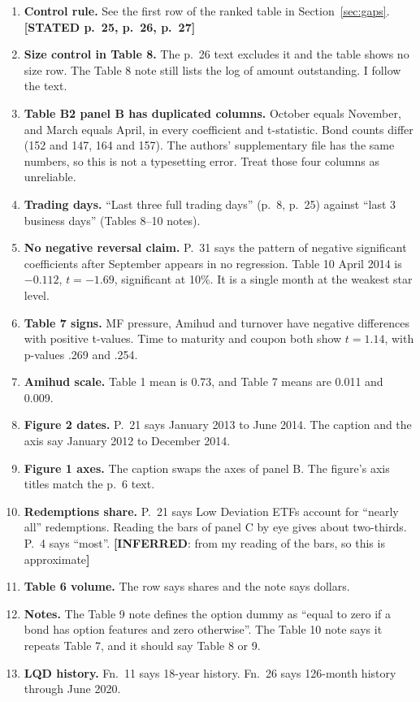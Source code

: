 \documentclass[10pt,a4paper]{article}
\newcommand{\ST}[1]{\textcolor{cst}{\textbf{[STATED #1]}}}
\newcommand{\IN}[1]{\textcolor{cin}{\textbf{[INFERRED}: #1\textbf{]}}}
\begin{document}
\begin{enumerate}
\item \textbf{Control rule.} See the first row of the ranked table in Section~\ref{sec:gaps}. \ST{p.~25, p.~26, p.~27}
\item \textbf{Size control in Table 8.} The p.~26 text excludes it and the table shows no size row. The Table 8 note still lists the log of amount outstanding. I follow the text.
\item \textbf{Table B2 panel B has duplicated columns.} October equals November, and March equals April, in every coefficient and t-statistic. Bond counts differ (152 and 147, 164 and 157). The authors' supplementary file has the same numbers, so this is not a typesetting error. Treat those four columns as unreliable.
\item \textbf{Trading days.} ``Last three full trading days'' (p.~8, p.~25) against ``last 3 business days'' (Tables 8--10 notes).
\item \textbf{No negative reversal claim.} P.~31 says the pattern of negative significant coefficients after September appears in no regression. Table 10 April 2014 is $-0.112$, $t=-1.69$, significant at 10\%. It is a single month at the weakest star level.
\item \textbf{Table 7 signs.} MF pressure, Amihud and turnover have negative differences with positive t-values. Time to maturity and coupon both show $t=1.14$, with p-values .269 and .254.
\item \textbf{Amihud scale.} Table 1 mean is 0.73, and Table 7 means are 0.011 and 0.009.
\item \textbf{Figure 2 dates.} P.~21 says January 2013 to June 2014. The caption and the axis say January 2012 to December 2014.
\item \textbf{Figure 1 axes.} The caption swaps the axes of panel B. The figure's axis titles match the p.~6 text.
\item \textbf{Redemptions share.} P.~21 says Low Deviation ETFs account for ``nearly all'' redemptions. Reading the bars of panel C by eye gives about two-thirds. P.~4 says ``most''. \IN{from my reading of the bars, so this is approximate}
\item \textbf{Table 6 volume.} The row says shares and the note says dollars.
\item \textbf{Notes.} The Table 9 note defines the option dummy as ``equal to zero if a bond has option features and zero otherwise''. The Table 10 note says it repeats Table 7, and it should say Table 8 or 9.
\item \textbf{LQD history.} Fn.~11 says 18-year history. Fn.~26 says 126-month history through June 2020.

\end{enumerate}
\end{document}
